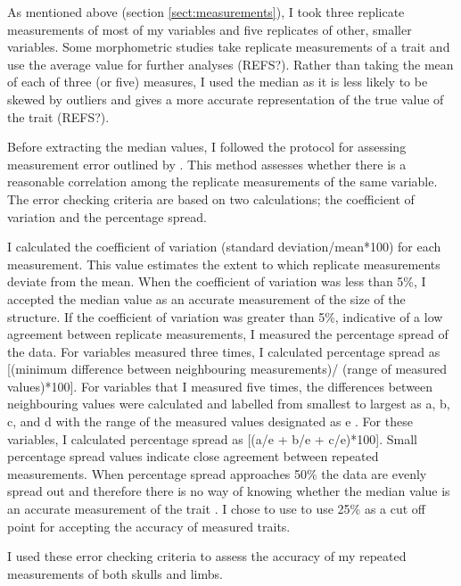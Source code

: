 	As mentioned above (section \ref{sect:measurements}), I took three replicate measurements of most of my variables and five replicates of other, smaller variables. 
	Some morphometric studies take replicate measurements of a trait and use the average value for further analyses (REFS?). Rather than taking the mean of each of three (or five) measures, I used the median as it is less likely to be skewed by outliers and gives a more accurate representation of the true value of the trait (REFS?).
	
	
	Before extracting the median values, I followed the protocol for assessing measurement error outlined by \citep{Cooper2009}. This method assesses whether there is a reasonable correlation among the replicate measurements of the same variable. The error checking criteria are based on two calculations; the coefficient of variation and the percentage spread.
	
	I calculated the coefficient of variation (standard deviation/mean*100) for each measurement. This value estimates the extent to which replicate measurements deviate from the mean. When the coefficient of variation was less than 5\%, I accepted the median value as an accurate measurement of the size of the structure. 
	If the coefficient of variation was greater than 5\%, indicative of a low agreement between replicate measurements, I measured the percentage spread of the data. For variables measured three times, I calculated percentage spread as [(minimum difference between neighbouring measurements)/ (range of measured values)*100].
	For variables that I measured five times, the differences between neighbouring values were calculated and labelled from smallest to largest as a, b, c, and d with the range of the measured values designated as e \citep{Cooper2009}. For these variables, I calculated percentage spread as [(a/e + b/e + c/e)*100]. 
	Small percentage spread values indicate close agreement between repeated measurements. When percentage spread approaches 50\% the data are evenly spread out and therefore there is no way of knowing whether the median value is an accurate measurement of the trait \citep{Cooper2009}. I chose to use to use 25\% as a cut off point for accepting the accuracy of measured traits.

	I used these error checking criteria to assess the accuracy of my repeated measurements of both skulls and limbs. 



